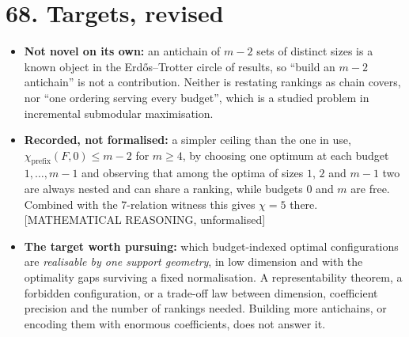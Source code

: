 \documentclass[9pt,twocolumn]{article}
\newcommand{\eclass}[1]{\textsf{[#1]}}
\renewcommand{\_}{\CIGunderscore\allowbreak}
\begin{document}
\section*{68. Targets, revised}
\begin{itemize}
\item \textbf{Not novel on its own:} an antichain of $m-2$ sets of distinct sizes is a known object in the Erd\H{o}s--Trotter circle of results, so ``build an $m-2$ antichain'' is not a contribution. Neither is restating rankings as chain covers, nor ``one ordering serving every budget'', which is a studied problem in incremental submodular maximisation.
\item \textbf{Recorded, not formalised:} a simpler ceiling than the one in use, $\chi_{\mathrm{prefix}}(F,0)\le m-2$ for $m\ge4$, by choosing one optimum at each budget $1,\dots,m-1$ and observing that among the optima of sizes $1$, $2$ and $m-1$ two are always nested and can share a ranking, while budgets $0$ and $m$ are free. Combined with the $7$-relation witness this gives $\chi=5$ there. \eclass{MATHEMATICAL REASONING, unformalised}
\item \textbf{The target worth pursuing:} which budget-indexed optimal configurations are \emph{realisable by one support geometry}, in low dimension and with the optimality gaps surviving a fixed normalisation. A representability theorem, a forbidden configuration, or a trade-off law between dimension, coefficient precision and the number of rankings needed. Building more antichains, or encoding them with enormous coefficients, does not answer it.
\end{itemize}
\end{document}
